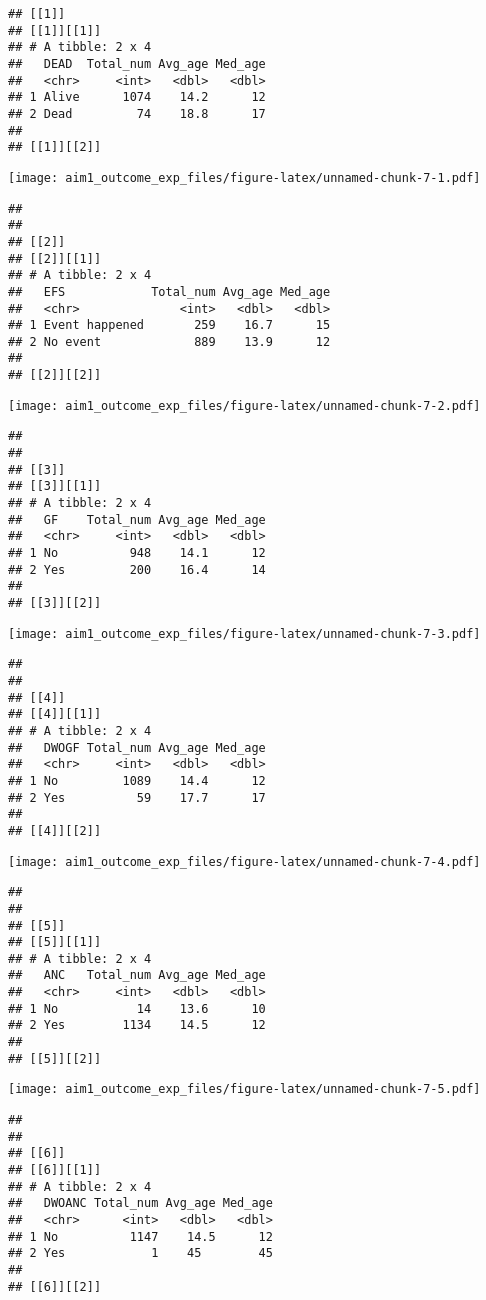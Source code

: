 \documentclass[
]{article}
\begin{document}
\begin{verbatim}
## [[1]]
## [[1]][[1]]
## # A tibble: 2 x 4
##   DEAD  Total_num Avg_age Med_age
##   <chr>     <int>   <dbl>   <dbl>
## 1 Alive      1074    14.2      12
## 2 Dead         74    18.8      17
## 
## [[1]][[2]]
\end{verbatim}

\texttt{[image: aim1\_outcome\_exp\_files/figure-latex/unnamed-chunk-7-1.pdf]}

\begin{verbatim}
## 
## 
## [[2]]
## [[2]][[1]]
## # A tibble: 2 x 4
##   EFS            Total_num Avg_age Med_age
##   <chr>              <int>   <dbl>   <dbl>
## 1 Event happened       259    16.7      15
## 2 No event             889    13.9      12
## 
## [[2]][[2]]
\end{verbatim}

\texttt{[image: aim1\_outcome\_exp\_files/figure-latex/unnamed-chunk-7-2.pdf]}

\begin{verbatim}
## 
## 
## [[3]]
## [[3]][[1]]
## # A tibble: 2 x 4
##   GF    Total_num Avg_age Med_age
##   <chr>     <int>   <dbl>   <dbl>
## 1 No          948    14.1      12
## 2 Yes         200    16.4      14
## 
## [[3]][[2]]
\end{verbatim}

\texttt{[image: aim1\_outcome\_exp\_files/figure-latex/unnamed-chunk-7-3.pdf]}

\begin{verbatim}
## 
## 
## [[4]]
## [[4]][[1]]
## # A tibble: 2 x 4
##   DWOGF Total_num Avg_age Med_age
##   <chr>     <int>   <dbl>   <dbl>
## 1 No         1089    14.4      12
## 2 Yes          59    17.7      17
## 
## [[4]][[2]]
\end{verbatim}

\texttt{[image: aim1\_outcome\_exp\_files/figure-latex/unnamed-chunk-7-4.pdf]}

\begin{verbatim}
## 
## 
## [[5]]
## [[5]][[1]]
## # A tibble: 2 x 4
##   ANC   Total_num Avg_age Med_age
##   <chr>     <int>   <dbl>   <dbl>
## 1 No           14    13.6      10
## 2 Yes        1134    14.5      12
## 
## [[5]][[2]]
\end{verbatim}

\texttt{[image: aim1\_outcome\_exp\_files/figure-latex/unnamed-chunk-7-5.pdf]}

\begin{verbatim}
## 
## 
## [[6]]
## [[6]][[1]]
## # A tibble: 2 x 4
##   DWOANC Total_num Avg_age Med_age
##   <chr>      <int>   <dbl>   <dbl>
## 1 No          1147    14.5      12
## 2 Yes            1    45        45
## 
## [[6]][[2]]
\end{verbatim}
\end{document}
